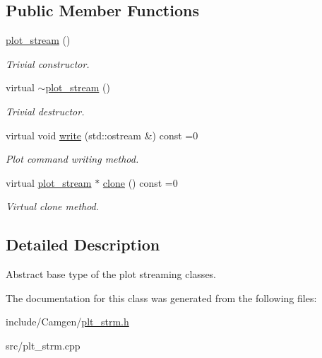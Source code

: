 \subsection*{Public Member Functions}
\begin{DoxyCompactItemize}
\item 
\hypertarget{a00432_a55d9ade8007c07c115c2cb837d895d37}{}\hyperlink{a00432_a55d9ade8007c07c115c2cb837d895d37}{plot\+\_\+stream} ()\label{a00432_a55d9ade8007c07c115c2cb837d895d37}

\begin{DoxyCompactList}\small\item\em Trivial constructor. \end{DoxyCompactList}\item 
\hypertarget{a00432_a6510b1620aa6fa695c1f1397e92bea4c}{}virtual \hyperlink{a00432_a6510b1620aa6fa695c1f1397e92bea4c}{$\sim$plot\+\_\+stream} ()\label{a00432_a6510b1620aa6fa695c1f1397e92bea4c}

\begin{DoxyCompactList}\small\item\em Trivial destructor. \end{DoxyCompactList}\item 
\hypertarget{a00432_a1bf2748c2bb6da34a39b10b303abd9bf}{}virtual void \hyperlink{a00432_a1bf2748c2bb6da34a39b10b303abd9bf}{write} (std\+::ostream \&) const =0\label{a00432_a1bf2748c2bb6da34a39b10b303abd9bf}

\begin{DoxyCompactList}\small\item\em Plot command writing method. \end{DoxyCompactList}\item 
\hypertarget{a00432_a8f00766cd1d70da570f2d7f769d4ac42}{}virtual \hyperlink{a00432}{plot\+\_\+stream} $\ast$ \hyperlink{a00432_a8f00766cd1d70da570f2d7f769d4ac42}{clone} () const =0\label{a00432_a8f00766cd1d70da570f2d7f769d4ac42}

\begin{DoxyCompactList}\small\item\em Virtual clone method. \end{DoxyCompactList}\end{DoxyCompactItemize}


\subsection{Detailed Description}
Abstract base type of the plot streaming classes. 

The documentation for this class was generated from the following files\+:\begin{DoxyCompactItemize}
\item 
include/\+Camgen/\hyperlink{a00724}{plt\+\_\+strm.\+h}\item 
src/plt\+\_\+strm.\+cpp\end{DoxyCompactItemize}
